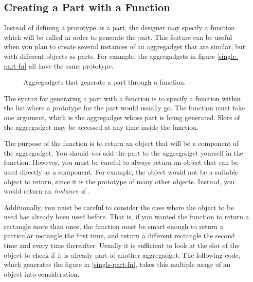 \begin{group}
\subsection{Creating a Part with a Function}
\label{creating-part-fn}

Instead of defining a prototype as a part, the designer may specify a
function which will be called in order to generate the part.  This
feature can be useful when you plan to create several instances of an
aggregadget that are similar, but with different objects as parts.
For example, the aggregadgets in figure \ref{single-part-fn} all have
the same prototype.

\vspace{0.25 inch}
\begin{figure}
\begin{center}
\end{center}
\caption{Aggregadgets that generate a part through a function.}
\end{figure}
\end{group}

The syntax for generating a part with a function is to specify a
function within the  list where a prototype for the part
would usually go.  The function must take one argument, which is the
aggregadget whose part is being generated.  Slots of the aggregadget
may be accessed at any time inside the function.

The purpose of the function is to return an
object that will be a component of the aggregadget.  You should
{\it not} add the part to the aggregadget yourself in the function.
However, you must be careful to always return an object that can be
used directly as a component.  For example, the  object
would not be a suitable object to return, since it is the prototype of
many other objects.  Instead, you would return an {\it instance} of
.

Additionally, you must be careful to consider the case where the
object to be used has already been used before.  That is, if you wanted
the function to return a rectangle more than once, the function must be
smart enough to return a particular rectangle the first time, and return
a different rectangle the second time and every time thereafter.
Usually it is sufficient to look at the  slot of the
object to check if it is already part of another aggregadget.  The
following code, which generates the figure in \ref{single-part-fn},
takes this multiple usage of an object into consideration.

